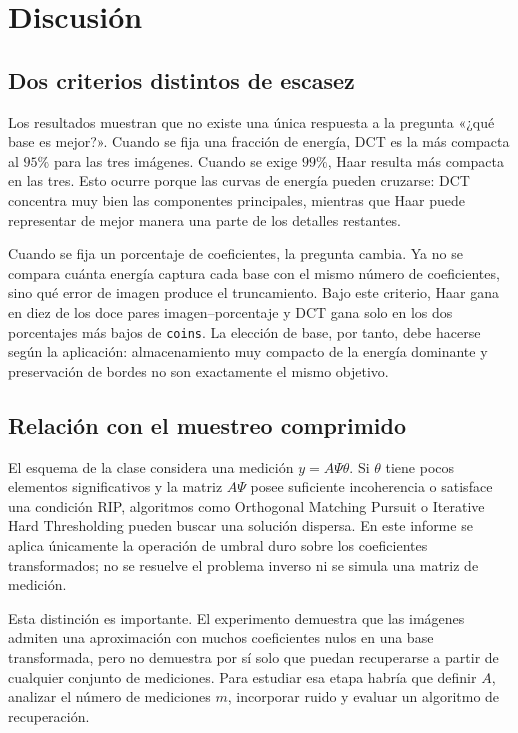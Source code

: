 \documentclass[11pt,a4paper]{article}
\begin{document}
\section{Discusión}

\subsection{Dos criterios distintos de escasez}

Los resultados muestran que no existe una única respuesta a la pregunta «¿qué base es mejor?». Cuando se fija una fracción de energía, DCT es la más compacta al $95\%$ para las tres imágenes. Cuando se exige $99\%$, Haar resulta más compacta en las tres. Esto ocurre porque las curvas de energía pueden cruzarse: DCT concentra muy bien las componentes principales, mientras que Haar puede representar de mejor manera una parte de los detalles restantes.

Cuando se fija un porcentaje de coeficientes, la pregunta cambia. Ya no se compara cuánta energía captura cada base con el mismo número de coeficientes, sino qué error de imagen produce el truncamiento. Bajo este criterio, Haar gana en diez de los doce pares imagen--porcentaje y DCT gana solo en los dos porcentajes más bajos de \texttt{coins}. La elección de base, por tanto, debe hacerse según la aplicación: almacenamiento muy compacto de la energía dominante y preservación de bordes no son exactamente el mismo objetivo.

\subsection{Relación con el muestreo comprimido}

El esquema de la clase considera una medición $y=A\Psi\theta$. Si $\theta$ tiene pocos elementos significativos y la matriz $A\Psi$ posee suficiente incoherencia o satisface una condición RIP, algoritmos como Orthogonal Matching Pursuit o Iterative Hard Thresholding pueden buscar una solución dispersa. En este informe se aplica únicamente la operación de umbral duro sobre los coeficientes transformados; no se resuelve el problema inverso ni se simula una matriz de medición.

Esta distinción es importante. El experimento demuestra que las imágenes admiten una aproximación con muchos coeficientes nulos en una base transformada, pero no demuestra por sí solo que puedan recuperarse a partir de cualquier conjunto de mediciones. Para estudiar esa etapa habría que definir $A$, analizar el número de mediciones $m$, incorporar ruido y evaluar un algoritmo de recuperación.
\end{document}
